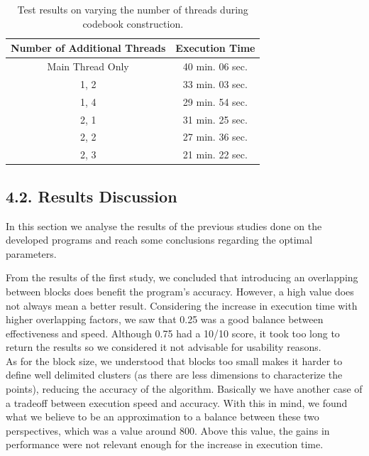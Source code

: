\documentclass[12pt]{article}
\begin{document}
\begin{table}[H]
  \begin{center}
    \begin{tabular}{c|c}
      \textbf{Number of Additional Threads} & \textbf{Execution Time}\\
      \hline
      Main Thread Only & 40 min. 06 sec.\\
      1, 2 & 33 min. 03 sec.\\
      1, 4 & 29 min. 54 sec.\\
      2, 1 & 31 min. 25 sec.\\
      2, 2 & 27 min. 36 sec.\\
      2, 3 & 21 min. 22 sec.\\
    \end{tabular}
  \end{center}
  \caption{Test results on varying the number of threads during codebook construction.}
  \label{tab:multithreading}
\end{table}

\subsection*{4.2. Results Discussion}

In this section we analyse the results of the previous studies done on the 
developed programs and reach some conclusions regarding the optimal parameters.

From the results of the first study, we concluded that introducing an overlapping 
between blocks does benefit the program's accuracy.
However, a high value does not always mean a better result.
Considering the increase in execution time with higher overlapping factors, we 
saw that 0.25 was a good balance between effectiveness and speed.
Although 0.75 had a 10/10 score, it took too long to return the results so we 
considered it not advisable for usability reasons.\\

As for the block size, we understood that blocks too small makes it harder to 
define well delimited clusters (as there are less dimensions to characterize the
points), reducing the accuracy of the algorithm.
Basically we have another case of a tradeoff between execution speed and accuracy.
With this in mind, we found what we believe to be an approximation to a balance
between these two perspectives, which was a value around 800. 
Above this value, the gains in performance were not relevant enough for the 
increase in execution time. \\
\end{document}
